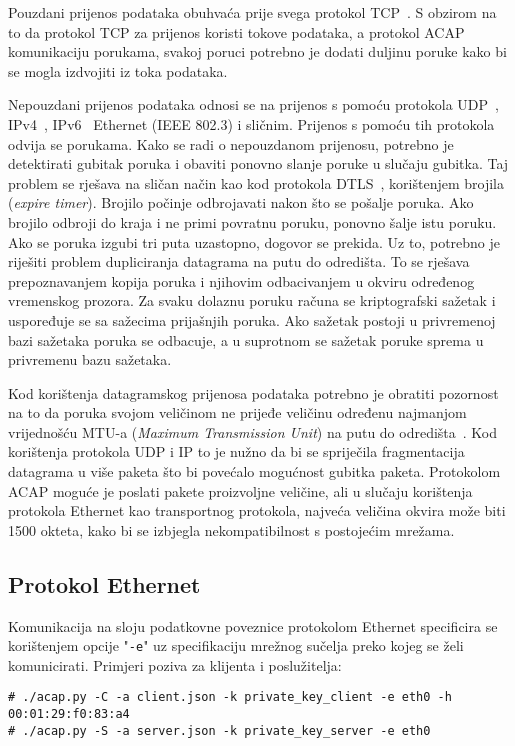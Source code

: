 Pouzdani prijenos podataka obuhvaća prije svega protokol TCP~\cite{rfc793}. S
obzirom na to da protokol TCP za prijenos koristi tokove podataka, a protokol ACAP
komunikaciju porukama, svakoj poruci potrebno je dodati duljinu poruke
kako bi se mogla izdvojiti iz toka podataka.

Nepouzdani prijenos podataka odnosi se na prijenos s pomoću protokola
UDP~\cite{rfc768}, IPv4~\cite{rfc791}, IPv6~\cite{rfc2460} Ethernet (IEEE 802.3)
i sličnim. Prijenos s
pomoću tih protokola odvija se porukama. Kako se radi o nepouzdanom prijenosu,
potrebno je detektirati gubitak poruka i obaviti ponovno slanje poruke u slučaju
gubitka. Taj problem se rješava na sličan način kao kod protokola
DTLS~\cite{rfc6347}, korištenjem brojila (\emph{expire timer}). Brojilo počinje
odbrojavati nakon što se pošalje poruka. Ako brojilo odbroji do kraja i ne primi
povratnu poruku, ponovno šalje istu poruku. Ako se poruka izgubi tri puta
uzastopno, dogovor se prekida. Uz to, potrebno je riješiti problem dupliciranja
datagrama na putu do odredišta. To se rješava prepoznavanjem kopija poruka i
njihovim odbacivanjem u okviru određenog vremenskog prozora. Za svaku dolaznu
poruku računa se kriptografski sažetak i uspoređuje se sa sažecima prijašnjih
poruka. Ako sažetak postoji u privremenoj bazi sažetaka poruka se odbacuje, a u
suprotnom se sažetak poruke sprema u privremenu bazu sažetaka.

Kod korištenja datagramskog prijenosa podataka potrebno je obratiti pozornost na
to da poruka svojom veličinom ne prijeđe veličinu određenu najmanjom vrijednošću
MTU-a (\emph{Maximum Transmission Unit}) na putu do odredišta~\cite{rfc1191}.
Kod korištenja protokola UDP i IP to je nužno da bi se spriječila fragmentacija
datagrama u više paketa što bi povećalo mogućnost gubitka paketa. Protokolom
ACAP moguće je poslati pakete proizvoljne veličine, ali u slučaju korištenja
protokola Ethernet kao transportnog protokola, najveća veličina okvira može biti
1500 okteta, kako bi se izbjegla nekompatibilnost s postojećim mrežama.

\subsection{Protokol Ethernet}
Komunikacija na sloju podatkovne poveznice protokolom Ethernet specificira se
korištenjem opcije "\texttt{-e}" uz specifikaciju mrežnog sučelja preko kojeg se
želi komunicirati. Primjeri poziva za klijenta i poslužitelja:
\begin{footnotesize}
\begin{verbatim}
# ./acap.py -C -a client.json -k private_key_client -e eth0 -h 00:01:29:f0:83:a4
# ./acap.py -S -a server.json -k private_key_server -e eth0
\end{verbatim}
\end{footnotesize}

